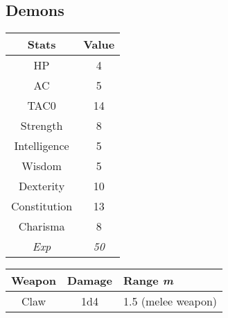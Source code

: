 \subsection{Demons}
\begin{table}[H]
  \centering
  \begin{tabular}{|c|c|}
    \hline
    \rowcolor[HTML]{C0C0C0}
    \textbf{Stats} & \textbf{Value} \\ \hline
    HP & 4 \\ \hline
    AC & 5 \\ \hline
    TAC0 & 14 \\ \hline
    Strength & 8 \\ \hline
    Intelligence & 5 \\ \hline
    Wisdom & 5  \\ \hline
    Dexterity & 10 \\ \hline
    Constitution & 13 \\ \hline
    Charisma & 8 \\ \hline
    \textit{Exp} & \textit{50} \\ \hline
  \end{tabular}
\end{table}
\begin{table}[H]
  \centering
  \begin{tabular}{|l|l|l|}
    \hline
    \rowcolor[HTML]{C0C0C0}
    \textbf{Weapon} & \textbf{Damage} & \textbf{Range \textit{m}} \\ \hline
    \multicolumn{1}{|c|}{Claw} & \multicolumn{1}{c|}{1d4} & \multicolumn{1}{c|}{1.5 (melee weapon)} \\ \hline
  \end{tabular}
\end{table}

